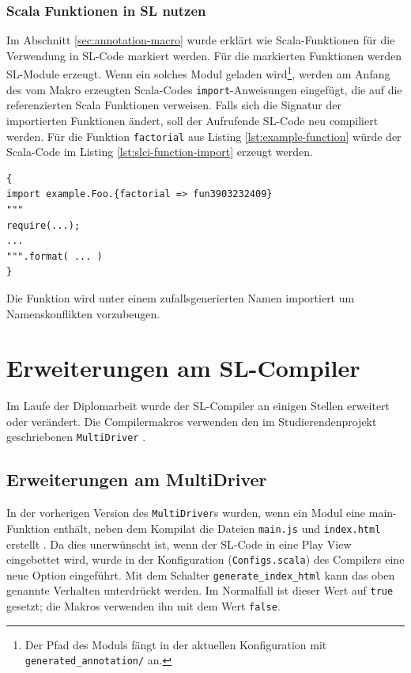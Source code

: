 \documentclass[12pt]{scrreprt}
\begin{document}
\subsection{Scala Funktionen in SL nutzen}

Im Abschnitt \ref{sec:annotation-macro} wurde erklärt wie Scala-Funktionen für die Verwendung in \ac{SL}-Code markiert werden. Für die markierten Funktionen werden \ac{SL}-Module erzeugt. Wenn ein solches Modul geladen wird\footnote{Der Pfad des Moduls fängt in der aktuellen Konfiguration mit \lstinline!generated_annotation/! an.}, werden am Anfang des vom Makro erzeugten Scala-Codes \lstinline!import!-Anweisungen eingefügt, die auf die referenzierten Scala Funktionen verweisen. Falls sich die Signatur der importierten Funktionen ändert, soll der Aufrufende SL-Code neu compiliert werden.
Für die Funktion \lstinline!factorial! aus Listing \ref{lst:example-function} würde der Scala-Code im Listing \ref{lst:slci-function-import} erzeugt werden.

\begin{lstlisting}[caption={Scala \lstinline!import!-Anweisung für eine annotierte Funktion}, label=lst:slci-function-import, float=h]
{
import example.Foo.{factorial => fun3903232409}
"""
require(...);
...
""".format( ... )
}
\end{lstlisting}

Die Funktion wird unter einem zufallsgenerierten Namen importiert um Namenskonflikten vorzubeugen.

\chapter{Erweiterungen am SL-Compiler}
\label{chap:dom-monad-extensions}

Im Laufe der Diplomarbeit wurde der \ac{SL}-Compiler an einigen Stellen erweitert oder verändert. Die Compilermakros verwenden den im Studierendenprojekt geschriebenen \lstinline!MultiDriver! \cite[S. 16-19]{Bisping2013}. 

\section{Erweiterungen am MultiDriver}

In der vorherigen Version des \lstinline!MultiDriver!s wurden, wenn ein Modul eine main-Funktion enthält, neben dem Kompilat die Dateien \lstinline!main.js! und \lstinline!index.html! erstellt \cite[S. 18-19]{Bisping2013}. Da dies unerwünscht ist, wenn der \ac{SL}-Code in eine Play View eingebettet wird, wurde in der Konfiguration (\lstinline!Configs.scala!) des Compilers eine neue Option eingeführt. Mit dem Schalter \lstinline!generate_index_html! kann das oben genannte Verhalten unterdrückt werden. Im Normalfall ist dieser Wert auf \lstinline!true! gesetzt; die Makros verwenden ihn mit dem Wert \lstinline!false!.
\end{document}
